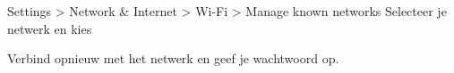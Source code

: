 Settings > Network \& Internet > Wi-Fi > Manage known networks
Selecteer je netwerk en kies 

Verbind opnieuw met het netwerk en geef je wachtwoord op.

